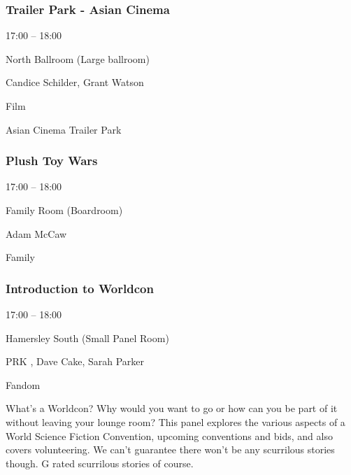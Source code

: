 \documentclass{scrreprt}
\begin{document}
\begin{multicols}{2}
\subsubsection*{Trailer Park - Asian Cinema}\begin{description}
\setlength{\itemsep}{0pt}
\setlength{\parsep}{0pt}
\setlength{\parskip}{0pt}
\item[Time:]{17:00 -- 18:00}
\item[Venue:]{North Ballroom (Large ballroom)}
\item[People:]{Candice Schilder, Grant Watson}
\item[Tags:]{Film}\end{description}
Asian Cinema Trailer Park
\subsubsection*{Plush Toy Wars}\begin{description}
\setlength{\itemsep}{0pt}
\setlength{\parsep}{0pt}
\setlength{\parskip}{0pt}
\item[Time:]{17:00 -- 18:00}
\item[Venue:]{Family Room (Boardroom)}
\item[People:]{Adam McCaw}
\item[Tags:]{Family}\end{description}

\subsubsection*{Introduction to Worldcon}\begin{description}
\setlength{\itemsep}{0pt}
\setlength{\parsep}{0pt}
\setlength{\parskip}{0pt}
\item[Time:]{17:00 -- 18:00}
\item[Venue:]{Hamersley South (Small Panel Room)}
\item[People:]{PRK , Dave Cake, Sarah Parker}
\item[Tags:]{Fandom}\end{description}
What's a Worldcon? Why would you want to go or how can you be part of it without leaving your lounge room? This panel explores the various aspects of a World Science Fiction Convention, upcoming conventions and bids, and also covers volunteering. We can't guarantee there won't be any scurrilous stories though. G rated scurrilous stories of course.

\end{multicols}
\end{document}
